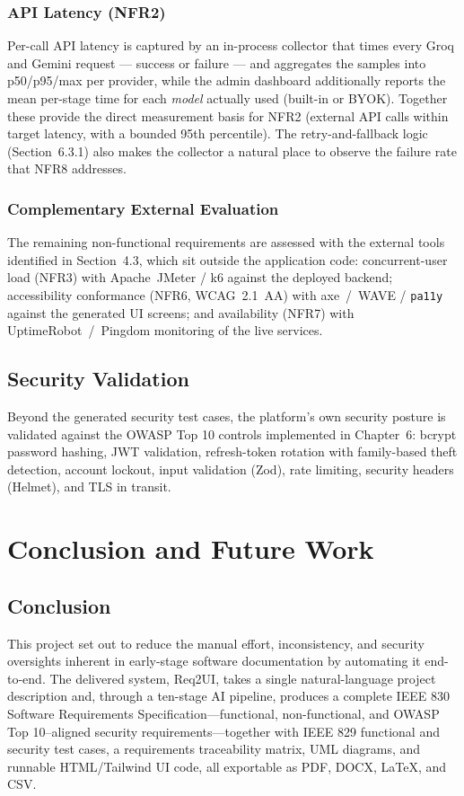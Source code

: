 \documentclass[12pt,a4paper,oneside]{report}
\begin{document}
\subsection{API Latency (NFR2)}
Per-call API latency is captured by an in-process collector that times every Groq and Gemini request --- success or failure --- and aggregates the samples into p50/p95/max per provider, while the admin dashboard additionally reports the mean per-stage time for each \emph{model} actually used (built-in or BYOK). Together these provide the direct measurement basis for NFR2 (external API calls within target latency, with a bounded 95th percentile). The retry-and-fallback logic (Section~6.3.1) also makes the collector a natural place to observe the failure rate that NFR8 addresses.

\subsection{Complementary External Evaluation}
The remaining non-functional requirements are assessed with the external tools identified in Section~4.3, which sit outside the application code: concurrent-user load (NFR3) with Apache~JMeter / k6 against the deployed backend; accessibility conformance (NFR6, WCAG~2.1~AA) with axe~/~WAVE / \texttt{pa11y} against the generated UI screens; and availability (NFR7) with UptimeRobot~/~Pingdom monitoring of the live services.

\section{Security Validation}
Beyond the generated security test cases, the platform's own security posture is validated against the OWASP Top 10 controls implemented in Chapter~6: bcrypt password hashing, JWT validation, refresh-token rotation with family-based theft detection, account lockout, input validation (Zod), rate limiting, security headers (Helmet), and TLS in transit. %

\chapter{Conclusion and Future Work}
\section{Conclusion}
This project set out to reduce the manual effort, inconsistency, and security oversights inherent in early-stage software documentation by automating it end-to-end. The delivered system, Req2UI, takes a single natural-language project description and, through a ten-stage AI pipeline, produces a complete IEEE 830 Software Requirements Specification---functional, non-functional, and OWASP Top 10--aligned security requirements---together with IEEE 829 functional and security test cases, a requirements traceability matrix, UML diagrams, and runnable HTML/Tailwind UI code, all exportable as PDF, DOCX, LaTeX, and CSV.
\end{document}
